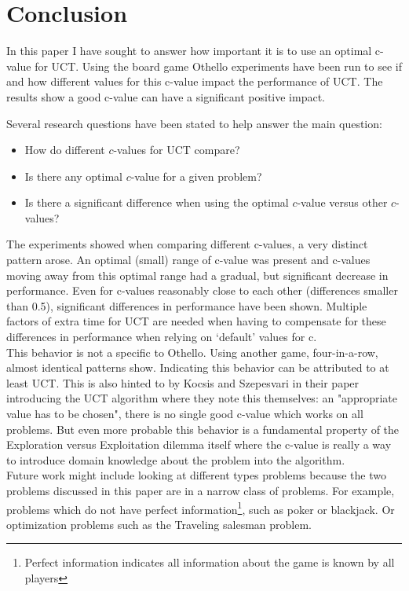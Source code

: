 \documentclass[
11pt, %
english, %
singlespacing, %
headsepline, %
]{MastersDoctoralThesis} %
\begin{document}
\chapter{Conclusion}
In this paper I have sought to answer how important it is to use an optimal c-value for UCT. Using the board game Othello experiments have been run to see if and how different values for this c-value impact the performance of UCT. The results show a good c-value can have a significant positive impact.

Several research questions have been stated to help answer the main question:
\begin{itemize}
	\setlength\itemsep{0em}
	\item How do different $c$-values for UCT compare?
	\item Is there any optimal $c$-value for a given problem?
	\item Is there a significant difference when using the optimal $c$-value versus other $c$-values?
\end{itemize}

The experiments showed when comparing different c-values, a very distinct pattern arose. An optimal (small) range of c-value was present and c-values moving away from this optimal range had a gradual, but significant decrease in performance. Even for c-values reasonably close to each other (differences smaller than 0.5), significant differences in performance have been shown. Multiple factors of extra time for UCT are needed when having to compensate for these differences in performance when relying on `default' values for c.\\

This behavior is not a specific to Othello. Using another game, four-in-a-row, almost identical patterns show. Indicating this behavior can be attributed to at least UCT. This is also hinted to by Kocsis and Szepesvari in their paper\cite{Kocsis:2006} introducing the UCT algorithm where they note this themselves: an "appropriate value has to be chosen", there is no single good c-value which works on all problems. But even more probable this behavior is a fundamental property of the Exploration versus Exploitation dilemma itself where the c-value is really a way to introduce domain knowledge about the problem into the algorithm.\\

Future work might include looking at different types problems because the two problems discussed in this paper are in a narrow class of problems. For example, problems which do not have perfect information\footnote{Perfect information indicates all information about the game is known by all players}, such as poker or blackjack. Or optimization problems such as the Traveling salesman problem.
\end{document}
